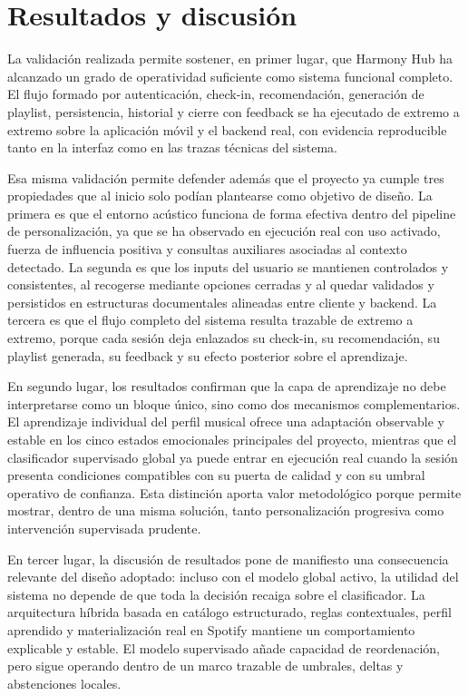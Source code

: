 \section{Resultados y discusión}
\label{sec:resultados_discusion}

La validación realizada permite sostener, en primer lugar, que Harmony Hub ha
alcanzado un grado de operatividad suficiente como sistema funcional completo.
El flujo formado por autenticación, check-in, recomendación, generación de
playlist, persistencia, historial y cierre con feedback se ha ejecutado de
extremo a extremo sobre la aplicación móvil y el backend real, con evidencia
reproducible tanto en la interfaz como en las trazas técnicas del sistema.

Esa misma validación permite defender además que el proyecto ya cumple tres
propiedades que al inicio solo podían plantearse como objetivo de diseño. La
primera es que el entorno acústico funciona de forma efectiva dentro del
pipeline de personalización, ya que se ha observado en ejecución real con uso
activado, fuerza de influencia positiva y consultas auxiliares asociadas al
contexto detectado. La segunda es que los inputs del usuario se mantienen
controlados y consistentes, al recogerse mediante opciones cerradas y al quedar
validados y persistidos en estructuras documentales alineadas entre cliente y
backend. La tercera es que el flujo completo del sistema resulta trazable de
extremo a extremo, porque cada sesión deja enlazados su check-in, su
recomendación, su playlist generada, su feedback y su efecto posterior sobre el
aprendizaje.

En segundo lugar, los resultados confirman que la capa de aprendizaje no debe
interpretarse como un bloque único, sino como dos mecanismos complementarios.
El aprendizaje individual del perfil musical ofrece una adaptación observable y
estable en los cinco estados emocionales principales del proyecto, mientras que
el clasificador supervisado global ya puede entrar en ejecución real cuando la
sesión presenta condiciones compatibles con su puerta de calidad y con su
umbral operativo de confianza. Esta distinción aporta valor metodológico porque
permite mostrar, dentro de una misma solución, tanto personalización
progresiva como intervención supervisada prudente.

En tercer lugar, la discusión de resultados pone de manifiesto una consecuencia
relevante del diseño adoptado: incluso con el modelo global activo, la utilidad
del sistema no depende de que toda la decisión recaiga sobre el clasificador.
La arquitectura híbrida basada en catálogo estructurado, reglas contextuales,
perfil aprendido y materialización real en Spotify mantiene un comportamiento
explicable y estable. El modelo supervisado añade capacidad de reordenación,
pero sigue operando dentro de un marco trazable de umbrales, deltas y
abstenciones locales.

